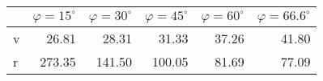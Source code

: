 \begin{tabular}{lrrrrr}
\toprule
{} &  $\varphi = 15^\circ$ &  $\varphi = 30^\circ$ &  $\varphi = 45^\circ$ &  $\varphi = 60^\circ$ &  $\varphi = 66.6^\circ$ \\
\midrule
v &                 26.81 &                 28.31 &                 31.33 &                 37.26 &                   41.80 \\
r &                273.35 &                141.50 &                100.05 &                 81.69 &                   77.09 \\
\bottomrule
\end{tabular}
